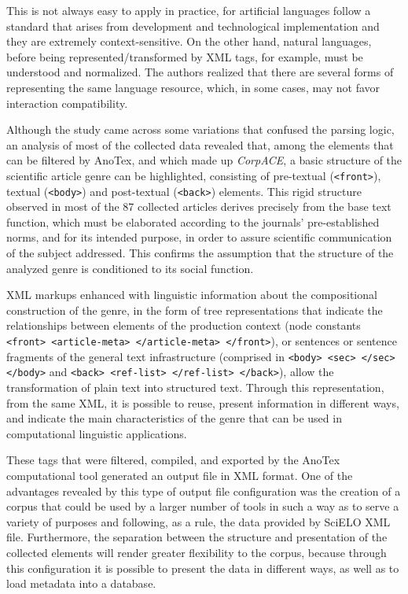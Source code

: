\documentclass[english]{textolivre}
\begin{document}
This is not always easy to apply in practice, for artificial languages follow a standard that arises from development and technological implementation and they are extremely context-sensitive. On the other hand, natural languages, before being represented/transformed by XML tags, for example, must be understood and normalized. The authors realized that there are several forms of representing the same language resource, which, in some cases, may not favor interaction compatibility.

Although the study came across some variations that confused the parsing logic, an analysis of most of the collected data revealed that, among the elements that can be filtered by AnoTex, and which made up \textit{CorpACE}, a basic structure of the scientific article genre can be highlighted, consisting of pre-textual (\texttt{<front>}), textual (\texttt{<body>}) and post-textual (\texttt{<back>}) elements. This rigid structure observed in most of the 87 collected articles derives precisely from the base text function, which must be elaborated according to the journals’ pre-established norms, and for its intended purpose, in order to assure scientific communication of the subject addressed. This confirms the assumption that the structure of the analyzed genre is conditioned to its social function.

XML markups enhanced with linguistic information about the compositional construction of the genre, in the form of tree representations that indicate the relationships between elements of the production context (node constants \texttt{<front> <article-meta> </article-meta> </front>}), or sentences or sentence fragments of the general text infrastructure (comprised in \texttt{<body> <sec> </sec> </body>} and \texttt{<back> <ref-list> </ref-list> </back>}), allow the transformation of plain text into structured text. Through this representation, from the same XML, it is possible to reuse, present information in different ways, and indicate the main characteristics of the genre that can be used in computational linguistic applications.

These tags that were filtered, compiled, and exported by the AnoTex computational tool generated an output file in XML format. One of the advantages revealed by this type of output file configuration was the creation of a corpus that could be used by a larger number of tools in such a way as to serve a variety of purposes and following, as a rule, the data provided by SciELO XML file. Furthermore, the separation between the structure and presentation of the collected elements will render greater flexibility to the corpus, because through this configuration it is possible to present the data in different ways, as well as to load metadata into a database.
\end{document}
